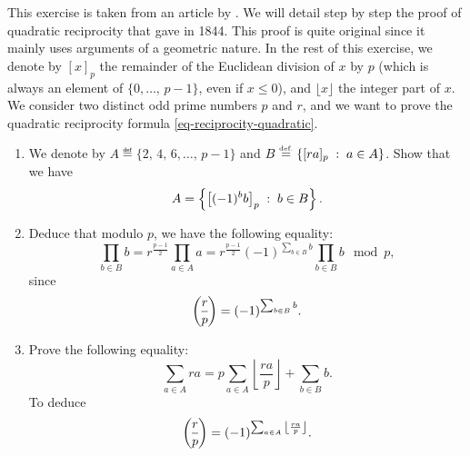 \begin{exo}
\label{exo-proof-geom-reciprocite}
 
  This exercise is taken from an article by . We will detail step by step the proof of quadratic reciprocity that  gave in 1844. This proof is quite original since it mainly uses arguments of a geometric nature. In the rest of this exercise, we denote by $ [x]_p $ the remainder of the Euclidean division of $ x $ by $ p $ (which is always an element of $ \{0, \ldots, \, p-1\} $, even if $ x \leq 0 $), and $ \lfloor x \rfloor $ the integer part of $ x $. We consider two distinct odd prime numbers $ p $ and $ r $, and we want to prove the quadratic reciprocity formula \eqref{eq-reciprocity-quadratic}. \begin{enumerate}
\item We denote by $ A \eqdef \{2, \, 4, \, 6, \ldots, \, p-1\} $ and $ B \stackrel{\mbox{\upshape\tiny def.}}{=} \left\{ [ra]_p \;:\; a \in A \right\} $. Show that we have
\begin{equation*}
A = \left\{ \left[(-1)^bb \right]_p \;:\; b \in B \right\}.
\end{equation*}
 
\item Deduce that modulo $ p $, we have the following equality:
\begin{equation*}
\prod_{b \in B}{b} = r^{\frac{p-1}{2}} \prod_{a \in A}{a} = r^{\frac{p-1}{2 }} (-1)^{\sum_{b \in B}{b}} \prod_{b \in B}{b} \mod{p},
\end{equation*}
since
\begin{equation*}
\legsymb{r}{p} = (-1)^{\sum_{b \in B}{b}}.
\end{equation*}
 
\item Prove the following equality:
\begin{equation*}
\sum_{a \in A}{ra} = p \sum_{a \in A}{\left\lfloor \frac{ra}{p} \right\rfloor} + \sum_{b \in B}{b }.
\end{equation*}
To deduce
\begin{equation*}
\legsymb{r}{p} = (-1)^{\sum_{a \in A}{\left\lfloor \frac{ra}{p} \right\rfloor}}.
\end{equation*}
 

\end{enumerate}
\end{exo}
